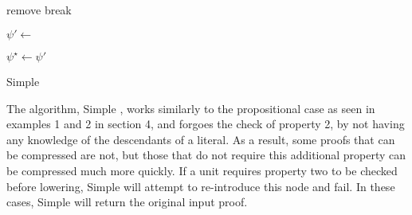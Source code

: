 \begin{algorithm}[bt]
  \SetAlgoVlined
  \SetAlgoShortEnd
{}
  \BlankLine


   {remove}
   {break}

  \BlankLine

  \BlankLine

\check{\Units} %

\BlankLine

    $\psi' \leftarrow $ \Del{$\psi$,$\Units$} \;
    \BlankLine

    

    $\psi^{\star} \leftarrow \psi'$ \;
  
    

  \caption{Simple \FOLowerUnits}
  \label{algo:simpleFOLU}
\end{algorithm}

The algorithm, Simple \FOLowerUnits, works similarly to the propositional case as seen in examples 1 and 2 in section 4, and forgoes the check of property 2, by not having any knowledge of the descendants of a literal. As a result, some proofs that can be compressed are not, but those that do not require this additional property can be compressed much more quickly. If a unit requires property two to be checked before lowering, Simple {\FOLowerUnits} will attempt to re-introduce this node and fail. In these cases, Simple \FOLowerUnits will return the original input proof.

